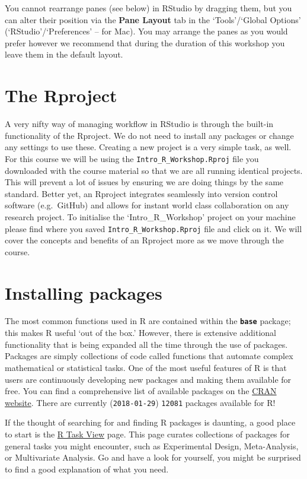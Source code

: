\documentclass[]{book}
\theoremstyle{definition}
\theoremstyle{definition}
\theoremstyle{definition}
\theoremstyle{remark}
\begin{document}
You cannot rearrange panes (see below) in RStudio by dragging them, but
you can alter their position via the \textbf{Pane Layout} tab in the
`Tools'/`Global Options' (`RStudio'/`Preferences' -- for Mac). You may
arrange the panes as you would prefer however we recommend that during
the duration of this workshop you leave them in the default layout.

\section{The Rproject}\label{the-rproject}

A very nifty way of managing workflow in RStudio is through the built-in
functionality of the Rproject. We do not need to install any packages or
change any settings to use these. Creating a new project is a very
simple task, as well. For this course we will be using the
\texttt{Intro\_R\_Workshop.Rproj} file you downloaded with the course
material so that we are all running identical projects. This will
prevent a lot of issues by ensuring we are doing things by the same
standard. Better yet, an Rproject integrates seamlessly into version
control software (e.g.~GitHub) and allows for instant world class
collaboration on any research project. To initialise the
`Intro\_R\_Workshop' project on your machine please find where you saved
\texttt{Intro\_R\_Workshop.Rproj} file and click on it. We will cover
the concepts and benefits of an Rproject more as we move through the
course.

\section{Installing packages}\label{installing-packages}

The most common functions used in R are contained within the
\textbf{\texttt{base}} package; this makes R useful `out of the box.'
However, there is extensive additional functionality that is being
expanded all the time through the use of packages. Packages are simply
collections of code called functions that automate complex mathematical
or statistical tasks. One of the most useful features of R is that users
are continuously developing new packages and making them available for
free. You can find a comprehensive list of available packages on the
\href{https://cran.r-project.org/web/packages/}{CRAN website}. There are
currently (\texttt{2018-01-29}) \texttt{12081} packages available for R!

If the thought of searching for and finding R packages is daunting, a
good place to start is the \href{http://cran.r-project.org/web/views/}{R
Task View} page. This page curates collections of packages for general
tasks you might encounter, such as Experimental Design, Meta-Analysis,
or Multivariate Analysis. Go and have a look for yourself, you might be
surprised to find a good explanation of what you need.
\end{document}
